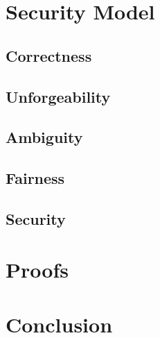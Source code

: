 \documentclass{beamer}
\begin{document}

\section{Security Model}


\subsection{Correctness}
% 

\subsection{Unforgeability}
% 

\subsection{Ambiguity}
% 

\subsection{Fairness}
% 

\subsection{Security}
% 

\section{Proofs}


\section{Conclusion}

\end{document}
